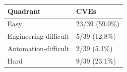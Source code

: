 \begin{tabular*}{\tblwidth}{@{} LL@{} }
\toprule
Quadrant & CVEs\\
\midrule
Easy & 23/39 (59.0\%) \\
Engineering-difficult & 5/39 (12.8\%) \\
Automation-difficult & 2/39 (5.1\%) \\
Hard & 9/39 (23.1\%) \\
\bottomrule
\end{tabular*}